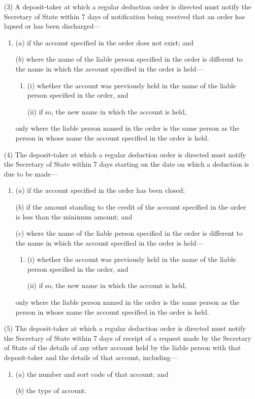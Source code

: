\documentclass[12pt,a4paper]{article}
\begin{document}
(3) A deposit-taker at which a regular deduction order is directed must notify the 
Secretary of State  %
within 7 days of notification being received that an order has lapsed or has been discharged—
\begin{enumerate}\item[]
($a$) if the account specified in the order does not exist; and

($b$) where the name of the liable person specified in the order is different to the name in which the account specified in the order is held—
\begin{enumerate}\item[]
(i) whether the account was previously held in the name of the liable person specified in the order, and

(ii) if so, the new name in which the account is held,
\end{enumerate}
only where the liable person named in the order is the same person as the person in whose name the account specified in the order is held.
\end{enumerate}

(4) The deposit-taker at which a regular deduction order is directed must notify the 
Secretary of State  %
within 7 days starting on the date on which a deduction is due to be made—
\begin{enumerate}\item[]
($a$) if the account specified in the order has been closed;

($b$) if the amount standing to the credit of the account specified in the order is less than the minimum amount; and

($c$) where the name of the liable person specified in the order is different to the name in which the account specified in the order is held—
\begin{enumerate}\item[]
(i) whether the account was previously held in the name of the liable person specified in the order, and

(ii) if so, the new name in which the account is held,
\end{enumerate}
only where the liable person named in the order is the same person as the person in whose name the account specified in the order is held.
\end{enumerate}

(5) The deposit-taker at which a regular deduction order is directed must notify the 
Secretary of State  %
within 7 days of receipt of a request made by the 
Secretary of State  %
of the details of any other account held by the liable person with that deposit-taker and the details of that account, including—
\begin{enumerate}\item[]
($a$) the number and sort code of that account; and

($b$) the type of account.
\end{enumerate}
\end{document}
